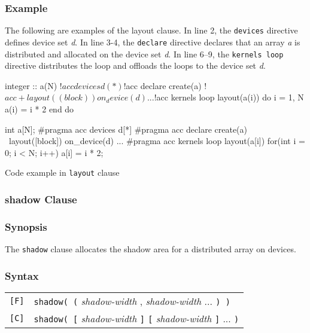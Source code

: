 \subsubsection*{Example}
The following are examples of the layout clause.
In line 2, the {\tt devices} directive defines device set {\it d}.
In line 3-4, the {\tt declare} directive declares that an array {\it a} is distributed and allocated on the device set {\it d}.
In line 6--9, the {\tt kernels loop} directive distributes the loop and offloads the loops to the device set {\it d}.
%
\begin{myfigure}
\begin{minipage}{0.47\hsize}
\begin{center}
\begin{XACCFexampleL}
integer :: a(N)
!$acc devices d(*)
!$acc declare create(a)
!$acc+layout((block)) on_device(d)
...
!$acc kernels loop layout(a(i))
do i = 1, N
  a(i) = i * 2
end do
\end{XACCFexampleL}
\end{center}
\end{minipage}
%
\begin{minipage}{0.48\hsize}
\begin{center}
\begin{XACCCexampleR}
int a[N];
#pragma acc devices d[*]
#pragma acc declare create(a) \
        layout([block]) on_device(d)
...
#pragma acc kernels loop layout(a[i])
for(int i = 0; i < N; i++){
  a[i] = i * 2;
}
\end{XACCCexampleR}
\end{center}
\end{minipage}
\caption{Code example in {\XACC} {\tt layout} clause}\label{code:layout_clause}
\end{myfigure}


\subsubsection{shadow Clause}
\subsubsection*{Synopsis}
The {\tt shadow} clause allocates the shadow area for a distributed array on devices.

\subsubsection*{Syntax}
\begin{tabular}{ll}
  \verb![F]! & \verb|shadow( (| {\it shadow-width} {\openb}, {\it shadow-width} {\closeb} ... \verb|) )|\\
  \verb![C]! & \verb|shadow( [| {\it shadow-width} \verb|]| {\openb} \verb|[| {\it shadow-width} \verb|]| {\closeb} ... \verb|)|
\end{tabular}

